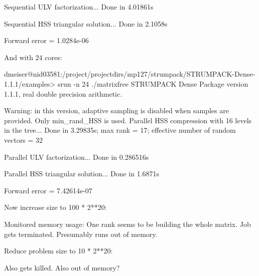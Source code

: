 \documentclass{acmsmall}
\begin{document}
Sequential ULV factorization...
Done in 4.01861s

Sequential HSS triangular solution...
Done in 2.1058s

Forward error = 1.0284e-06


And with 24 cores:


dmeiser@nid03581:/project/projectdirs/mp127/strumpack/STRUMPACK-Dense-1.1.1/examples>
srun -n 24 ./matrixfree
STRUMPACK Dense Package version 1.1.1, real double precision arithmetic.

Warning: in this version, adaptive sampling is disabled when samples are
provided. Only min_rand_HSS is used.
Parallel HSS compression with 16 levels in the tree...
Done in 3.29835s; max rank = 17; effective number of random vectors = 32

Parallel ULV factorization...
Done in 0.286516s

Parallel HSS triangular solution...
Done in 1.6871s

Forward error = 7.42614e-07


Now increase size to 100 * 2**20:


Monitored memory usage:  One rank seems to be building the whole matrix.
Job gets terminated.  Presumably runs out of memory.



Reduce problem size to 10 * 2**20:

Also gets killed.  Also out of memory?




\fi
\end{document}
